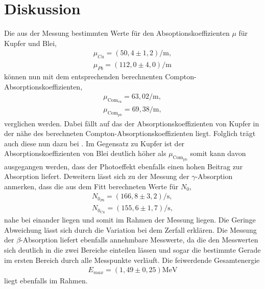 \newpage
\section{Diskussion}
\label{sec:Diskussion}
Die aus der Messung bestimmten Werte für den Absoptionskoeffizienten $\mu$
für Kupfer und Blei,
\begin{align*}
\mu_{Cu}=(50,4\pm1,2)\si{\per\meter},\\
\mu_{Pb}=(112,0\pm4,0)\si{\per\meter}
\end{align*}
können nun mit dem entsprechenden berechnenten Compton-Absorptionskoeffizienten,
\begin{align*}
  \mu_\mathrm{Com_{cu}}={63,02\si{\per\meter}},\\
  \mu_\mathrm{Com_{pb}}={69,38\si{\per\meter}},
\end{align*}
verglichen werden.
Dabei fällt auf das der Absorptionskoeffizienten von Kupfer
in der nähe des berechneten Compton-Absorptionskoeffizienten liegt.
Folglich trägt auch diese nun dazu bei .
Im Gegensatz zu Kupfer ist der Absorptionskoeffizienten von Blei deutlich höher
als $\mu_\mathrm{Com_{pb}}$ somit kann davon ausgegangen werden, dass der
Photoeffekt ebenfalls einen hohen Beitrag zur Absorption liefert.
Deweitern lässt sich zu der Messung der $\gamma$-Absorption anmerken, dass
die aus dem Fitt berechneten Werte für $N_0$,
\begin{align*}
  N_{0_{Pb}}=(166,8\pm3,2)\si{\per\second},\\
  N_{0_{Cu}}=(155,6\pm1,7)\si{\per\second},
\end{align*}
nahe bei einander liegen und somit im Rahmen der Messung liegen. Die Geringe Abweichung lässt
sich durch die Variation bei dem Zerfall erklären.
Die Messung der $\beta$-Absorption liefert ebenfalls annehmbare Messwerte, da
die den Messwerten sich deutlich in die zwei Bereiche einteilen lässen
und sogar die bestimmte Gerade im ersten Bereich durch alle Messpunkte verläuft.
Die feiwerdende Gesamtenergie
\begin{align*}
  E_{max}=(1,49\pm0,25)\si{\mega\electronvolt}
\end{align*}
liegt ebenfalls im Rahmen.
